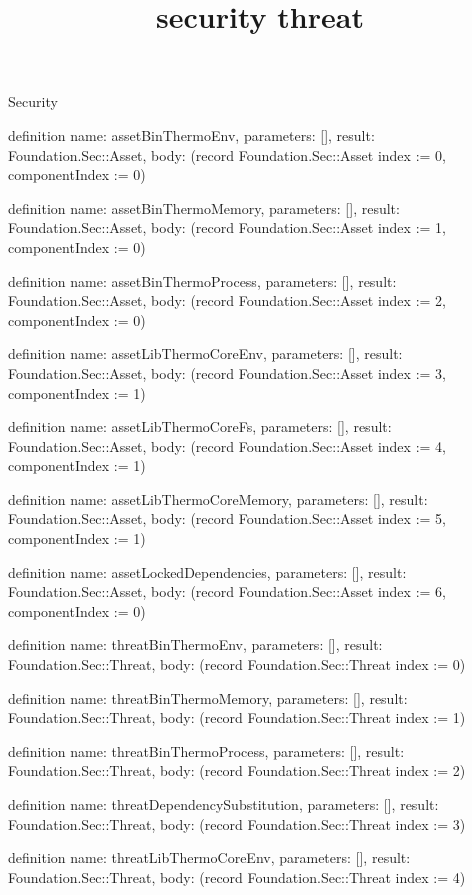 \begin{lexlean}{Security}
\title{security threat}
\begin{semanticmodule}
definition{
  name: assetBinThermoEnv,
  parameters: [],
  result: Foundation.Sec::Asset,
  body: (record Foundation.Sec::Asset {index := 0, componentIndex := 0})
}

definition{
  name: assetBinThermoMemory,
  parameters: [],
  result: Foundation.Sec::Asset,
  body: (record Foundation.Sec::Asset {index := 1, componentIndex := 0})
}

definition{
  name: assetBinThermoProcess,
  parameters: [],
  result: Foundation.Sec::Asset,
  body: (record Foundation.Sec::Asset {index := 2, componentIndex := 0})
}

definition{
  name: assetLibThermoCoreEnv,
  parameters: [],
  result: Foundation.Sec::Asset,
  body: (record Foundation.Sec::Asset {index := 3, componentIndex := 1})
}

definition{
  name: assetLibThermoCoreFs,
  parameters: [],
  result: Foundation.Sec::Asset,
  body: (record Foundation.Sec::Asset {index := 4, componentIndex := 1})
}

definition{
  name: assetLibThermoCoreMemory,
  parameters: [],
  result: Foundation.Sec::Asset,
  body: (record Foundation.Sec::Asset {index := 5, componentIndex := 1})
}

definition{
  name: assetLockedDependencies,
  parameters: [],
  result: Foundation.Sec::Asset,
  body: (record Foundation.Sec::Asset {index := 6, componentIndex := 0})
}

definition{
  name: threatBinThermoEnv,
  parameters: [],
  result: Foundation.Sec::Threat,
  body: (record Foundation.Sec::Threat {index := 0})
}

definition{
  name: threatBinThermoMemory,
  parameters: [],
  result: Foundation.Sec::Threat,
  body: (record Foundation.Sec::Threat {index := 1})
}

definition{
  name: threatBinThermoProcess,
  parameters: [],
  result: Foundation.Sec::Threat,
  body: (record Foundation.Sec::Threat {index := 2})
}

definition{
  name: threatDependencySubstitution,
  parameters: [],
  result: Foundation.Sec::Threat,
  body: (record Foundation.Sec::Threat {index := 3})
}

definition{
  name: threatLibThermoCoreEnv,
  parameters: [],
  result: Foundation.Sec::Threat,
  body: (record Foundation.Sec::Threat {index := 4})
}


\end{semanticmodule}
\end{lexlean}
